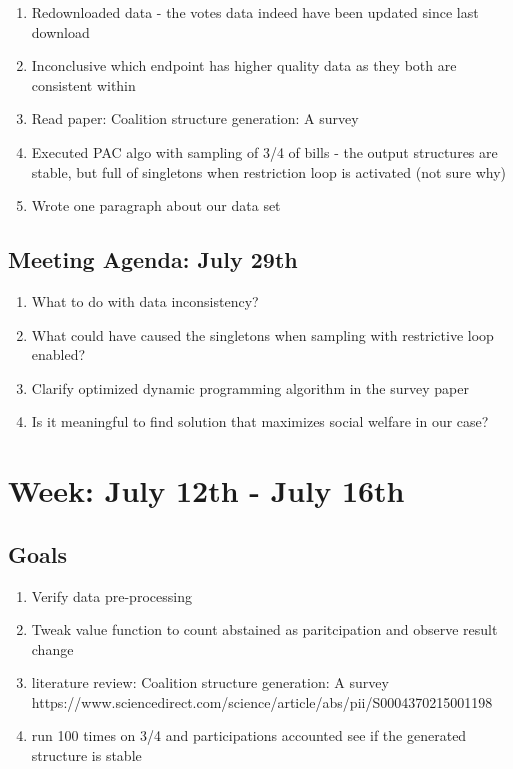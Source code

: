 \documentclass[a4paper]{article}
\begin{document}
\begin{enumerate}
  \item Redownloaded data - the votes data indeed have been updated since last download
  \item Inconclusive which endpoint has higher quality data as they both are consistent within
  \item Read paper: Coalition structure generation: A survey
  \item Executed PAC algo with sampling of 3/4 of bills - the output structures are stable, but full of singletons when restriction loop is activated (not sure why)
  \item Wrote one paragraph about our data set
\end{enumerate}

\subsection*{Meeting Agenda: July 29th}

\begin{enumerate}
  \item What to do with data inconsistency?
  \item What could have caused the singletons when sampling with restrictive loop enabled?
  \item Clarify optimized dynamic programming algorithm in the survey paper
  \item Is it meaningful to find solution that maximizes social welfare in our case?
\end{enumerate}

\section*{Week: July 12th - July 16th}

\subsection*{Goals}

\begin{enumerate}
  \item Verify data pre-processing
  \item Tweak value function to count abstained as paritcipation and observe result change
  \item literature review: Coalition structure generation: A survey https://www.sciencedirect.com/science/article/abs/pii/S0004370215001198
  \item run 100 times on 3/4 and participations accounted see if the generated structure is stable
\end{enumerate}
\end{document}
